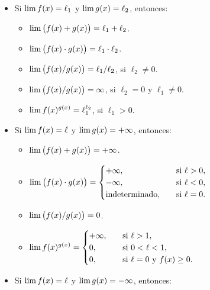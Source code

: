 \begin{itemize}
    \item Si $\displaystyle \lim f(x) = \ell_1$ y $\displaystyle \lim g(x)=\ell_2$, entonces:
    \begin{itemize}
        \item $\displaystyle \lim \big(f(x)+g(x)\big) = \ell_1+\ell_2$.
        \item $\displaystyle \lim \big(f(x)\cdot g(x)\big) = \ell_1\cdot \ell_2$.
        \item $\displaystyle \lim \big(f(x)/g(x)\big) = \ell_1/\ell_2$, si $\ell_2\neq 0$.
        \item $\displaystyle \lim \big(f(x)/g(x)\big) = \infty$, si $\ell_2= 0$ y $\ell_1\neq 0$.
        \item $\displaystyle \lim f(x)^{g(x)} = \ell_1^{\ell_2}$, si $\ell_1>0$.
    \end{itemize}
    \item Si $\displaystyle \lim f(x) = \ell$ y $\displaystyle \lim g(x)=+\infty$, entonces:
    \begin{itemize}
        \item $\displaystyle \lim \big(f(x)+g(x)\big) = +\infty$.
        \item $\displaystyle \lim \big(f(x)\cdot g(x)\big) = \begin{cases}
            +\infty, \quad&\text{si }\ell>0,\\
            -\infty, \quad&\text{si }\ell<0,\\
            \text{indeterminado}, \quad&\text{si }\ell=0.
        \end{cases}$
        \item $\displaystyle \lim \big(f(x)/g(x)\big) = 0$.
        \item $\displaystyle \lim f(x)^{g(x)} =\begin{cases}
            +\infty, \quad&\text{si }\ell>1,\\
            0, \quad&\text{si } 0<\ell<1,\\
            0, \quad&\text{si } \ell=0 \text{ y }f(x)\ge 0.
        \end{cases}$
    \end{itemize}
    \item Si $\displaystyle \lim f(x) = \ell$ y $\displaystyle \lim g(x)=-\infty$, entonces:
\end{itemize}
